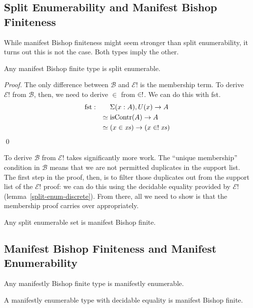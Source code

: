 \subsection{Split Enumerability and Manifest Bishop Finiteness}
While manifest Bishop finiteness might seem stronger than split enumerability,
it turns out this is not the case.
Both types imply the other.
\begin{romlemma}
  Any manifest Bishop finite type is split enumerable.
\end{romlemma}
\begin{proof}
  The only difference between \(\mathcal{B}\) and \(\mathcal{E}!\) is the
  membership term.
  To derive \(\mathcal{E}!\) from \(\mathcal{B}\), then, we need to derive
  \(\in\) from \(\inunique\).
  We can do this with fst.
  \begin{alignat*}{4}
    &\text{fst} : && \; \Sigma(x : A) , U(x) \rightarrow A \\
    && \simeq      & \; \text{isContr}(A) \rightarrow A \\
    && \simeq      & \; (x \in \mathit{xs}) \rightarrow (x \inunique \mathit{xs})
  \end{alignat*}
  \qed
\end{proof}

To derive \(\mathcal{B}\) from \(\mathcal{E}!\) takes significantly more work.
The ``unique membership'' condition in \(\mathcal{B}\) means that we are not
permitted duplicates in the support list.
The first step in the proof, then, is to filter those duplicates out from the
support list of the \(\mathcal{E}!\) proof: we can do this using the decidable
equality provided by \(\mathcal{E}!\) (lemma~\ref{split-enum-discrete}).
From there, all we need to show is that the membership proof carries over
appropriately.
\begin{romlemma} \label{split-enum-to-manifest-bishop}
  Any split enumerable set is manifest Bishop finite.
\end{romlemma}
\subsection{Manifest Bishop Finiteness and Manifest Enumerability}
\begin{romlemma}
  Any manifestly Bishop finite type is manifestly enumerable.
\end{romlemma}
\begin{romlemma}
  A manifestly enumerable type with decidable equality is manifest Bishop
  finite.
\end{romlemma}
